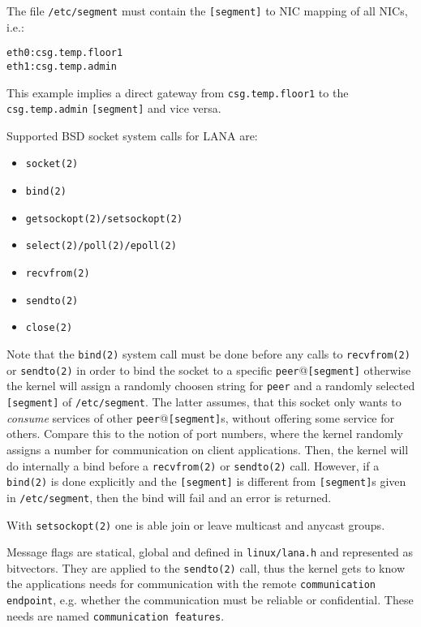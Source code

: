 \documentclass[times,10pt,twocolumn]{article}
\begin{document}
The file \texttt{/etc/segment} must contain the \texttt{[segment]} to NIC 
mapping of all NICs, i.e.:\newline

\scriptsize{
\begin{lstlisting}
eth0:csg.temp.floor1
eth1:csg.temp.admin
\end{lstlisting}
}
\normalsize

This example implies a direct gateway from \texttt{csg.temp.floor1} to 
the \texttt{csg.temp.admin} \texttt{[segment]} and vice versa.

Supported BSD socket system calls for LANA are:
\begin{itemize}
	\setlength{\itemsep}{-1mm}
	\item \texttt{socket(2)}
	\item \texttt{bind(2)}
	\item \texttt{getsockopt(2)/setsockopt(2)}
	\item \texttt{select(2)/poll(2)/epoll(2)}
	\item \texttt{recvfrom(2)}
	\item \texttt{sendto(2)}
	\item \texttt{close(2)}
\end{itemize}

Note that the \texttt{bind(2)} system call must be done before any calls
to \texttt{recvfrom(2)} or \texttt{sendto(2)} in order to bind the socket
to a specific \texttt{peer}@\texttt{[segment]} otherwise the kernel will
assign a randomly choosen string for \texttt{peer} and a randomly selected
\texttt{[segment]} of \texttt{/etc/segment}. The latter assumes, that this
socket only wants to \textit{consume} services of other
\texttt{peer}@\texttt{[segment]}s, without offering some service for others.
Compare this to the notion of port numbers, where the kernel randomly
assigns a number for communication on client applications. Then, the kernel
will do internally a bind before a \texttt{recvfrom(2)} or \texttt{sendto(2)}
call. However, if a \texttt{bind(2)} is done explicitly and the \texttt{[segment]}
is different from \texttt{[segment]}s given in \texttt{/etc/segment}, then
the bind will fail and an error is returned.\newline

With \texttt{setsockopt(2)} one is able join or leave multicast and anycast
groups.

Message flags are statical, global and defined in \texttt{linux/lana.h} and 
represented as bitvectors. They are applied to the \texttt{sendto(2)} call, 
thus the kernel gets to know the applications needs for communication with 
the remote \texttt{communication endpoint}, e.g. whether the communication 
must be reliable or confidential. These needs are named \texttt{communication 
features}.
\end{document}

